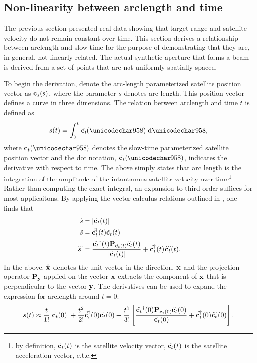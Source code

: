 \subsection{Non-linearity between arclength and time}
The previous section presented real data showing that target range and satellite velocity do not remain constant over time. This section derives a relationship between arclength and slow-time for the purpose of demonstrating that they are, in general, not linearly related. The actual synthetic aperture that forms a beam is derived from a set of points that are not uniformly spatially-spaced.
\par
To begin the derivation, denote the arc-length parameterized satellite position vector as $\mathbf{c}_s(s)$, where the parameter $s$ denotes arc length. This position vector defines a curve in three dimensions. The relation between arclength and time $t$ is defined as
\begin{equation}
 s(t)=\int_0^t\lvert\dot{\satt}(\xi)\rvert\d{\xi},
\end{equation}
where $\satt(\xi)$ denotes the slow-time parameterized satellite position vector and the dot notation, $\dot{\satt}(\xi)$, indicates the derivative with respect to time. The above simply states that arc length is the integration of the amplitude of the intantanous satellite velocity over time\footnote{by definition, $\dot{\mathbf{c}_t}(t)$ is the satellite velocity vector, $\ddot{\mathbf{c}_t}(t)$ is the satellite acceleration vector, e.t.c.}. Rather than computing the exact integral, an expansion to third order suffices for most applicaitons. By applying the vector calculus relations outlined in , one finds that
\begin{align}
 \dot{s} &= \lvert\dot{\satt}(t)\rvert\\
 \ddot{s} &= \htr{\hat{\dot{\satt}}}(t)\ddot{\satt}(t)\\
 \dddot{s} &= \frac{\htr{\ddot{\satt}}(t)\mtx{P}_{\dot{\satt}(t)}\ddot{\satt}(t)}{\lvert\dot{\satt}(t)\rvert} + \htr{\hat{\dot{\satt}}}(t)\dddot{\satt}(t).
\end{align}
In the above, $\hat{\mathbf{x}}$ denotes the unit vector in the direction, $\mathbf{x}$ and the projection operator $\mtx{P}_{\vct{y}}$ applied on the vector $\mathbf{x}$ extracts the component of $\mathbf{x}$ that is perpendicular to the vector $\mathbf{y}$. The derivatives can be used to
expand the expression for arclength around $t=0$:
\begin{equation}
 s(t) \approx \frac{t}{1!}\lvert\dot{\satt}(0)\rvert + \frac{t^2}{2!}\htr{\hat{\dot{\satt}}}(0)\ddot{\satt}(0) + \frac{t^3}{3!}\left[\frac{\htr{\ddot{\satt}}(0)\mtx{P}_{\dot{\satt}(0)}\ddot{\satt}(0)}{\lvert\dot{\satt}(0)\rvert} + \htr{\hat{\dot{\satt}}}(0)\dddot{\satt}(0)\right].
\end{equation}
